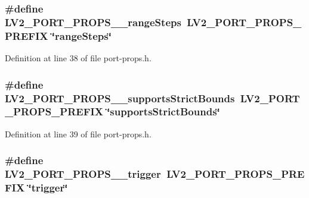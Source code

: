 \subsubsection[{\texorpdfstring{L\+V2\+\_\+\+P\+O\+R\+T\+\_\+\+P\+R\+O\+P\+S\+\_\+\+\_\+range\+Steps}{LV2_PORT_PROPS__rangeSteps}}]{\setlength{\rightskip}{0pt plus 5cm}\#define L\+V2\+\_\+\+P\+O\+R\+T\+\_\+\+P\+R\+O\+P\+S\+\_\+\+\_\+range\+Steps~{\bf L\+V2\+\_\+\+P\+O\+R\+T\+\_\+\+P\+R\+O\+P\+S\+\_\+\+P\+R\+E\+F\+IX} \char`\"{}range\+Steps\char`\"{}}\hypertarget{port-props_8h_a2cc6c1537a6ee64cf950ca330db8a27a}{}\label{port-props_8h_a2cc6c1537a6ee64cf950ca330db8a27a}


Definition at line 38 of file port-\/props.\+h.

\subsubsection[{\texorpdfstring{L\+V2\+\_\+\+P\+O\+R\+T\+\_\+\+P\+R\+O\+P\+S\+\_\+\+\_\+supports\+Strict\+Bounds}{LV2_PORT_PROPS__supportsStrictBounds}}]{\setlength{\rightskip}{0pt plus 5cm}\#define L\+V2\+\_\+\+P\+O\+R\+T\+\_\+\+P\+R\+O\+P\+S\+\_\+\+\_\+supports\+Strict\+Bounds~{\bf L\+V2\+\_\+\+P\+O\+R\+T\+\_\+\+P\+R\+O\+P\+S\+\_\+\+P\+R\+E\+F\+IX} \char`\"{}supports\+Strict\+Bounds\char`\"{}}\hypertarget{port-props_8h_a609e7e1c6f5e9d2697670e17508b392a}{}\label{port-props_8h_a609e7e1c6f5e9d2697670e17508b392a}


Definition at line 39 of file port-\/props.\+h.

\subsubsection[{\texorpdfstring{L\+V2\+\_\+\+P\+O\+R\+T\+\_\+\+P\+R\+O\+P\+S\+\_\+\+\_\+trigger}{LV2_PORT_PROPS__trigger}}]{\setlength{\rightskip}{0pt plus 5cm}\#define L\+V2\+\_\+\+P\+O\+R\+T\+\_\+\+P\+R\+O\+P\+S\+\_\+\+\_\+trigger~{\bf L\+V2\+\_\+\+P\+O\+R\+T\+\_\+\+P\+R\+O\+P\+S\+\_\+\+P\+R\+E\+F\+IX} \char`\"{}trigger\char`\"{}}\hypertarget{port-props_8h_a580d9ea28cfe9cd9bdf4ace6e0abb4c4}{}\label{port-props_8h_a580d9ea28cfe9cd9bdf4ace6e0abb4c4}


